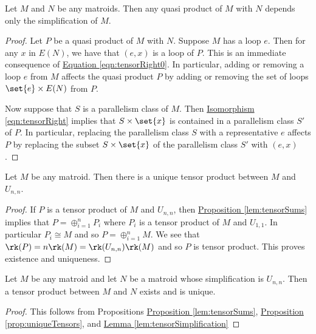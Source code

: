     \begin{lemma}\label{lem:tensorSimplification}
    Let $M$ and $N$ be any matroids. Then any quasi product of $M$ with $N$ depends only the simplification of $M$. 
    \end{lemma}
    \begin{proof}
        Let $P$ be a quasi product of $M$ with $N$. Suppose $M$ has a loop $e$. Then for any $x$ in $E(N)$, we have that $(e,x)$ is a loop of $P$. This is an immediate consequence of \hyperref[eqn:tensorRight0]{Equation \ref*{eqn:tensorRight0}}. In particular, adding or removing a loop $e$ from $M$ affects the quasi product $P$ by adding or removing the set of loops $\set{e}\times E(N)$ from $P$. 

        Now suppose that $S$ is a parallelism class of $M$. Then \hyperref[eqn:tensorRight]{Isomorphism \ref*{eqn:tensorRight}} implies that $S\times \set{x}$ is contained in a parallelism class $S'$ of $P$. In particular, replacing the parallelism class $S$ with a representative $e$ affects $P$ by replacing the subset $S\times \set{x}$ of the parallelism class $S'$ with $(e,x)$. 
    \end{proof}
\begin{proposition}\label{prop:uniqueTensors}
Let $M$ be any matroid. Then there is a unique tensor product between $M$ and $U_{n,n}$.
\end{proposition}
    \begin{proof}
            If $P$ is a tensor product of $M$ and $U_{n,n}$, then \hyperref[lem:tensorSums]{Proposition \ref*{lem:tensorSums}} implies that $P = \oplus_{i=1}^n P_i$ where $P_i$ is a tensor product of $M$ and $U_{1,1}$. In particular $P_i\cong M$ and so $P=\oplus_{i=1}^n M$. We see that $\rk(P)=n\rk(M)=\rk(U_{n,n})\rk(M)$ and so $P$ is tensor product. This proves existence and uniqueness.
    \end{proof}

    \begin{corollary}\label{cor:uniqueSimplification}
        Let $M$ be any matroid and let $N$ be a matroid whose simplification is $U_{n,n}$. Then a tensor product between $M$ and $N$ exists and is unique.
    \end{corollary}
    \begin{proof}
    This follows from Propositions \hyperref[lem:tensorSums]{Proposition \ref*{lem:tensorSums}}, \hyperref[prop:uniqueTensors]{Proposition \ref*{prop:uniqueTensors}}, and \hyperref[lem:tensorSimplification]{Lemma \ref*{lem:tensorSimplification}}
    \end{proof}
 
